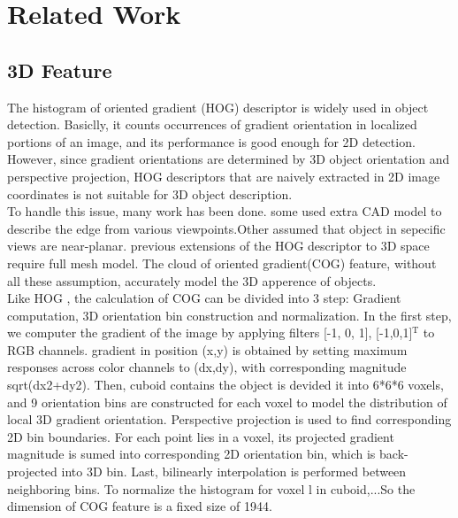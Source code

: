 \documentclass[english]{ccdconf}
\begin{document}
\section{Related Work}

\subsection{3D Feature}
The histogram of oriented gradient (HOG) descriptor \cite{dalal2005histograms} is widely used in object detection. Basiclly, it counts occurrences of gradient orientation in localized portions of an image, and its performance is good enough for 2D detection.  However, since gradient orientations are determined by 3D object orientation and perspective projection, HOG descriptors that are naively extracted in 2D image coordinates is not suitable for 3D object description.\\
To handle this issue, many work has been done. some used extra CAD model to describe the edge from various viewpoints\cite{aubry2014seeing}.Other assumed that object in sepecific views are near-planar\cite{fidler20123d}. previous extensions of the HOG descriptor  to 3D space require full mesh model\cite{buch20093d}. The cloud of oriented gradient(COG) feature, without all these assumption, accurately model the 3D apperence of objects.\\
Like HOG , the calculation of COG can be divided into 3 step: Gradient computation, 3D orientation bin construction and normalization. In the first step, we computer the gradient of the image by applying filters [-1, 0, 1], [-1,0,1]$^\mathrm{T}$ to RGB channels. gradient in position (x,y) is obtained by setting  maximum responses across
color channels to (dx,dy), with corresponding magnitude sqrt(dx2+dy2).
Then, cuboid contains the object is devided it into 6*6*6 voxels, and 9 orientation bins are constructed for each voxel to model the distribution of local 3D gradient orientation. Perspective projection is used to find corresponding 2D bin boundaries. For each point lies in a voxel, its projected gradient magnitude is sumed into corresponding 2D orientation bin, which is back-projected into 3D bin. Last, bilinearly interpolation is performed between neighboring bins.
To normalize the histogram for voxel l in cuboid,...So the dimension of COG feature is a fixed size of 1944.
\end{document}
